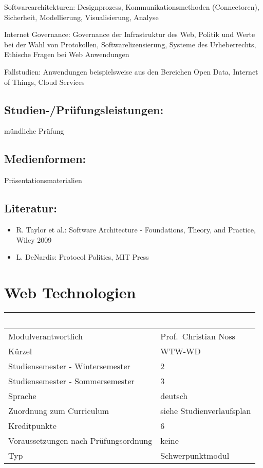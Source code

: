 Softwarearchitekturen: Designprozess, Kommunikationsmethoden
(Connectoren), Sicherheit, Modellierung, Visualisierung, Analyse

Internet Governance: Governance der Infrastruktur des Web, Politik und
Werte bei der Wahl von Protokollen, Softwarelizensierung, Systeme des
Urheberrechts, Ethische Fragen bei Web Anwendungen

Fallstudien: Anwendungen beispielsweise aus den Bereichen Open Data,
Internet of Things, Cloud Services

\section*{Studien-/Prüfungsleistungen:}\label{studien-pruxfcfungsleistungen-28}

mündliche Prüfung

\section*{Medienformen:}\label{medienformen-28}

Präsentationsmaterialien

\section*{Literatur:}\label{literatur-25}

\begin{itemize}
\item
  R. Taylor et al.: Software Architecture - Foundations, Theory, and
  Practice, Wiley 2009
\item
  L. DeNardis: Protocol Politics, MIT Press
\end{itemize}

\chapter{Web Technologien}\label{web-technologien}

\begin{longtable}[]{@{}ll@{}}
\toprule
~ & ~\tabularnewline
\midrule
\endhead
Modulverantwortlich & Prof.~Christian Noss\tabularnewline
Kürzel & WTW-WD\tabularnewline
Studiensemester - Wintersemester & 2\tabularnewline
Studiensemester - Sommersemester & 3\tabularnewline
Sprache & deutsch\tabularnewline
Zuordnung zum Curriculum & siehe Studienverlaufsplan\tabularnewline
Kreditpunkte & 6\tabularnewline
Voraussetzungen nach Prüfungsordnung & keine\tabularnewline
Typ & Schwerpunktmodul\tabularnewline
\bottomrule
\end{longtable}

